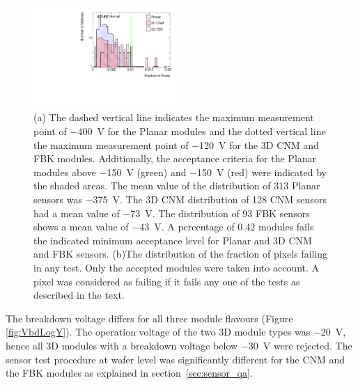 \begin{figure}
	\centering
		\subfloat[\label{fig:modTotalPixFail}]{}\includegraphics[width=0.49\textwidth]{Images/ibl_paper/chapter04_Modules/TotalPixFailLogY_int.pdf}
  \caption{(a) The dashed vertical line indicates the maximum measurement point of \SI{-400}{\volt} for the Planar  modules and the dotted vertical line the maximum measurement point of \SI{-120}{\volt} for the 3D CNM and FBK modules. Additionally, the acceptance criteria for the Planar modules above \SI{-150}{\volt} (green) and \SI{-150}{\volt} (red) were indicated by the shaded areas. The mean value of the distribution of 313 Planar  sensors was \SI{-375}{\volt}. The 3D CNM distribution of 128 CNM sensors had a mean value of \SI{-73}{\volt}. The distribution of 93 FBK sensors shows a mean value of \SI{-43}{\volt}. A percentage of 0.42 modules fails the indicated minimum acceptance level for Planar  and 3D CNM and FBK sensors. (b)The distribution of the fraction of pixels failing in any test. Only the accepted modules were taken into account. A pixel was considered as failing if it fails any one of the tests as described in the text.}
\end{figure}
The breakdown voltage differs for all three module flavours (Figure \ref{fig:VbdLogY}). The operation voltage of the two 3D module types was \SI{-20}{\volt}, hence all 3D modules with a breakdown voltage below \SI{-30}{\volt} were rejected. The sensor test procedure at wafer level was significantly different for the CNM and the FBK modules as explained in section~\ref{sec:sensor_qa}.
